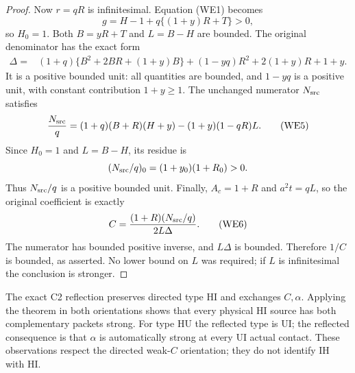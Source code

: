 \begin{proof}
Now $r=qR$ is infinitesimal.  Equation (WE1) becomes
\[
             g=H-1+q\{(1+y)R+T\}>0,
\]
so $H_0=1$.  Both $B=yR+T$ and $L=B-H$ are bounded.
The original denominator has the exact form
\begin{align*}
 \Delta={}&(1+q)\{B^2+2BR+(1+y)B\}
           +(1-yq)R^2+2(1+y)R+1+y.                \tag{WE4}
\end{align*}
It is a positive bounded unit: all quantities are bounded, and
$1-yq$ is a positive unit, with constant contribution $1+y\geq1$.
The unchanged numerator $N_{\rm src}$ satisfies
\[
 \frac{N_{\rm src}}q
  =(1+q)(B+R)(H+y)-(1+y)(1-qR)L.                  \tag{WE5}
\]
Since $H_0=1$ and $L=B-H$, its residue is
\[
       (N_{\rm src}/q)_0=(1+y_0)(1+R_0)>0.
\]
Thus $N_{\rm src}/q$ is a positive bounded unit.  Finally,
$A_c=1+R$ and $a^2t=qL$, so the original coefficient is exactly
\[
          C=\frac{(1+R)(N_{\rm src}/q)}{2L\Delta}.
                                                               \tag{WE6}
\]
The numerator has bounded positive inverse, and $L\Delta$ is
bounded.  Therefore $1/C$ is bounded, as asserted.  No lower bound
on $L$ was required; if $L$ is infinitesimal the conclusion is
stronger.
\end{proof}

The exact C2 reflection preserves directed type HI and exchanges
$C,\alpha$.  Applying the theorem in both orientations shows that
every physical HI source has both complementary packets strong.
For type HU the reflected type is UI; the reflected consequence is
that $\alpha$ is automatically strong at every UI actual contact.
These observations respect the directed weak-$C$ orientation; they
do not identify IH with HI.
